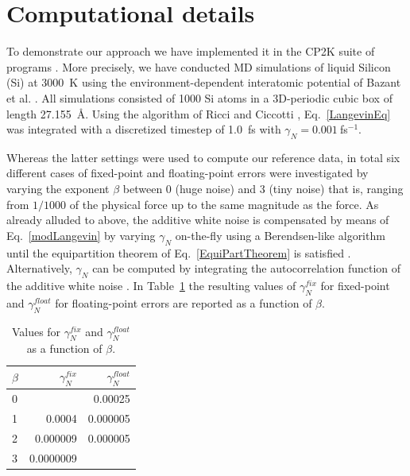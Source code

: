 \documentclass[preprint]{elsarticle}
\begin{document}
\section{Computational details}
\label{sec:computational}
To demonstrate our approach we have implemented it in the CP2K suite of programs \cite{cp2k}. More precisely, we have conducted MD simulations of liquid Silicon (Si) at 3000~K using the environment-dependent interatomic potential of Bazant et al. \cite{EIP1,EIP2}.
All simulations consisted of 1000 Si atoms in a 3D-periodic cubic box of length 27.155~\AA. Using the algorithm of Ricci and Ciccotti \cite{Ricci}, Eq.~\ref{LangevinEq} was integrated with a discretized timestep of 1.0~fs with $\gamma_N = 0.001~$fs$^{-1}$.

Whereas the latter settings were used to compute our reference data, in total six different cases of fixed-point and floating-point errors were investigated by varying the exponent $\beta$ between 0 (huge noise) and 3 (tiny noise) that is, ranging from $1/1000$ of the physical force up to the same magnitude as the force.
As already alluded to above, the additive white noise is compensated by means of Eq.~\ref{modLangevin} by varying $\gamma_N$ on-the-fly using a Berendsen-like algorithm until the equipartition theorem of Eq.~\ref{EquiPartTheorem} is satisfied \cite{Berendsen,TDKwater,TDKrev}. Alternatively, $\gamma_N$ can be computed by integrating the autocorrelation function of the additive white noise \cite{RZK}.
In Table~\ref{tab:gamma} the resulting values of \textit{\(\gamma_N^{fix}\)} for fixed-point and \textit{\(\gamma_N^{float}\)} for floating-point errors are reported as a function of \textit{\(\beta\)}.
\begin{table}
  \caption{Values for \textit{\(\gamma_N^{fix}\)} and \textit{\(\gamma_N^{float}\)} as a function of \textit{\(\beta\)}.}
  \centering
  \label{tab:gamma}
  \begin{tabular}{lrr}
    \textit{\(\beta\)} & \textit{\(\gamma_N^{fix}\)} & \textit{\(\gamma_N^{float}\)} \\
    \hline
    0 &           & 0.00025  \\
    1 & 0.0004    & 0.000005 \\
    2 & 0.000009  & 0.000005 \\
    3 & 0.0000009 &
  \end{tabular}
\end{table}
\end{document}
